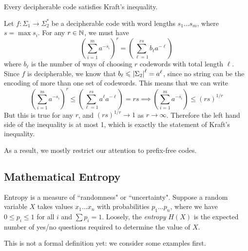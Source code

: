 \documentclass{article}
\begin{document}
\begin{theorem}
	\label{mcmillan-karush}
    Every decipherable code satisfies Kraft's inequality.
\end{theorem}

\begin{prf}
	Let $f: \Sigma_1 \to \Sigma_2^*$
	be a decipherable code with word lengths $s_1 \dots s_m$,
	where $s = \max s_i$.
	For any $r \in \mathbb{N}$, we must have
	\[
	\left( \sum_{i=1}^m a^{-s_i} \right)^r =
	\left( \sum_{\ell=1}^{rs} b_\ell a^{-\ell} \right)
	\]
	where $b_\ell$ is the number of ways
	of choosing $r$ codewords with total length $\ell$.
	Since $f$ is decipherable,
	we know that $b_\ell \leqslant \left\lvert \Sigma_2 \right\rvert^\ell = a^\ell$,
	since no string can be the encoding of more than one set of codewords.
	This means that we can write
	\[
	\left( \sum_{i=1}^m a^{-s_i} \right)^r \leq
	\left( \sum_{\ell=1}^{rs} a^\ell a^{-\ell} \right) =
	rs
	\implies
	\left( \sum_{i=1}^m a^{-s_i} \right) \leq
	(rs)^{1/r}
	\]
	But this is true for any $r$,
	and $(rs)^{1/r} \to 1$ as $r \to \infty$.
	Therefore the left hand side of the inequality is at most 1,
	which is exactly the statement of Kraft's inequality.
\end{prf}

As a result, we mostly restrict our attention to prefix-free codes.


\subsection{Mathematical Entropy}
\label{section-noiseless-entropy}

Entropy is a measure of ``randomness" or ``uncertainty".
Suppose a random variable $X$
takes values $x_1 \dots x_n$
with probabilities $p_1 \dots p_n$,
where we have $0 \leq p_i \leq 1$ for all $i$
and $\sum p_i = 1$.
Loosely, the \textit{entropy} $H(X)$ is
the expected number of yes/no questions required to determine the value of $X$.

This is not a formal definition yet: we consider some examples first.
\end{document}
